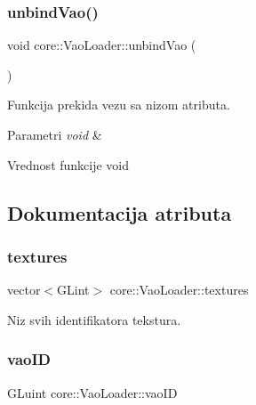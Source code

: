 \subsubsection{\texorpdfstring{unbind\+Vao()}{unbindVao()}}
{\footnotesize\ttfamily void core\+::\+Vao\+Loader\+::unbind\+Vao (\begin{DoxyParamCaption}\item[{void}]{ }\end{DoxyParamCaption})\hspace{0.3cm}{\ttfamily [private]}}



Funkcija prekida vezu sa nizom atributa. 


\begin{DoxyParams}{Parametri}
{\em void} & \\
\hline
\end{DoxyParams}
\begin{DoxyReturn}{Vrednost funkcije}
void 
\end{DoxyReturn}


\subsection{Dokumentacija atributa}
\mbox{\label{classcore_1_1VaoLoader_a6f2a03c0bca3b9c8211215014747cbaa}} 
\subsubsection{\texorpdfstring{textures}{textures}}
{\footnotesize\ttfamily vector$<$G\+Lint$>$ core\+::\+Vao\+Loader\+::textures\hspace{0.3cm}{\ttfamily [private]}}



Niz svih identifikatora tekstura. 

\mbox{\label{classcore_1_1VaoLoader_a09fec3fcaf674c66046a859e60c9c674}} 
\subsubsection{\texorpdfstring{vao\+ID}{vaoID}}
{\footnotesize\ttfamily G\+Luint core\+::\+Vao\+Loader\+::vao\+ID\hspace{0.3cm}{\ttfamily [private]}}



